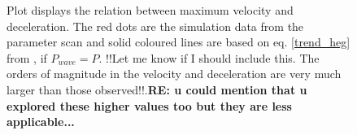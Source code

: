 \begin{figure}
\captionsetup[subfigure]{labelformat=empty}
\centering
{}
\caption{Plot displays the relation between maximum velocity and deceleration. The red dots are the simulation data from the parameter scan and solid coloured lines are based on eq. \eqref{trend_heg} from \cite{Heggland2007ApJ6661277H}, if $P_{wave}=P$. {\color{green}!!Let me know if I should include this. The orders of magnitude in the velocity and deceleration are very much larger than those observed!!}.{\bf RE: u could mention that u explored these higher values too but they are less applicable...}}
\label{decell}
\end{figure}

